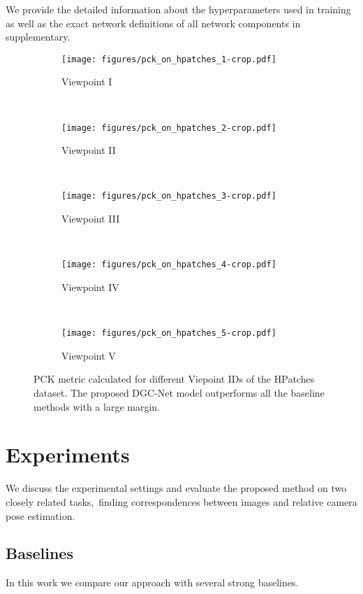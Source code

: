 \documentclass[10pt,twocolumn,letterpaper]{article}
\begin{document}
We provide the detailed information about the hyperparameters used in training as well as the exact network definitions of all network components in supplementary.

\begin{figure*}[t!]
 	\centering
 	\begin{subfigure}[t]{.2\textwidth}
 		\centering
\texttt{[image: figures/pck\_on\_hpatches\_1-crop.pdf]}
 		\caption{Viewpoint I}
 	\end{subfigure}~
 	\begin{subfigure}[t]{.2\textwidth}
 		\centering
 		\texttt{[image: figures/pck\_on\_hpatches\_2-crop.pdf]}
 		\caption{Viewpoint II}
 	\end{subfigure}~
 	\begin{subfigure}[t]{.2\textwidth}
 		\centering
 		\texttt{[image: figures/pck\_on\_hpatches\_3-crop.pdf]}
 		\caption{Viewpoint III}
 	\end{subfigure}~
 	\begin{subfigure}[t]{.2\textwidth}
 		\centering
 		\texttt{[image: figures/pck\_on\_hpatches\_4-crop.pdf]}
 		\caption{Viewpoint IV}
 	\end{subfigure}~
 	\begin{subfigure}[t]{.2\textwidth}
 		\centering
 		\texttt{[image: figures/pck\_on\_hpatches\_5-crop.pdf]}
 		\caption{Viewpoint V}\end{subfigure}
\caption{PCK metric calculated for different Viepoint IDs of the HPatches dataset. The proposed DGC-Net model outperforms all the baseline methods with a large margin.}\label{fig:pck_hpatches}
\vspace{-2mm}
\end{figure*}

\vspace{-2mm}
\section{Experiments}
\vspace{-1mm}
We discuss the experimental settings and evaluate the proposed method on two closely related tasks,~\ie finding correspondences between images and relative camera pose estimation. 

\subsection{Baselines}
\vspace{-1mm}
In this work we compare our approach with several strong baselines.
\end{document}
